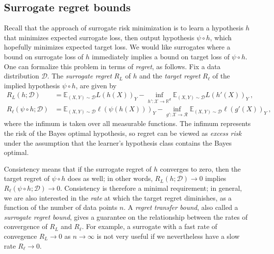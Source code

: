 \documentclass[twoside,11pt]{article}
\newcommand{\reals}{\mathbb{R}}
\newcommand{\D}{\mathcal{D}}
\newcommand{\E}{\mathbb{E}}
\newcommand{\R}{\mathcal{R}}
\newcommand{\X}{\mathcal{X}}
\begin{document}
\subsection{Surrogate regret bounds}\label{subsec:regret-bounds}
Recall that the approach of surrogate risk minimization is to learn a hypothesis $h$ that minimizes expected surrogate loss, then output hypothesis $\psi \circ h$, which hopefully minimizes expected target loss.
We would like surrogates where a bound on surrogate loss of $h$ immediately implies a bound on target loss of $\psi \circ h$.
One can formalize this problem in terms of \emph{regret}, as follows.
Fix a data distribution $\D$.
The \emph{surrogate regret} $R_L$ of $h$ and the \emph{target regret} $R_{\ell}$ of the implied hypothesis $\psi \circ h$, are given by
\begin{align*}
  R_L(h;\D) &= \E_{(X,Y)\sim\D} L(h(X))_Y - \inf_{h':\X\to\reals^d} \E_{(X,Y)\sim\D} L(h'(X))_Y~,
  \\
  R_\ell(\psi\circ h;\D) &= \E_{(X,Y)\sim\D} \ell(\psi(h(X)))_Y - \inf_{g':\X\to\R} \E_{(X,Y)\sim\D} \ell(g'(X))_Y~,
\end{align*}
where the infimum is taken over all measurable functions.
The infimum represents the risk of the Bayes optimal hypothesis, so regret can be viewed as \emph{excess risk} under the assumption that the learner's hypothesis class contains the Bayes optimal.

Consistency means that if the surrogate regret of $h$ converges to zero, then the target regret of $\psi \circ h$ does as well; in other words, $R_L(h;\D) \to 0$ implies $R_{\ell}(\psi \circ h;\D) \to 0$.
Consistency is therefore a minimal requirement; in general, we are also interested in the \emph{rate} at which the target regret diminishes, as a function of the number of data points $n$.
A \emph{regret transfer bound}, also called a \emph{surrogate regret bound}, gives a guarantee on the relationship between the rates of convergence of $R_L$ and $R_{\ell}$.
For example, a surrogate with a fast rate of convegence $R_L \to 0$ as $n \to \infty$ is not very useful if we nevertheless have a slow rate $R_{\ell} \to 0$.
\end{document}
